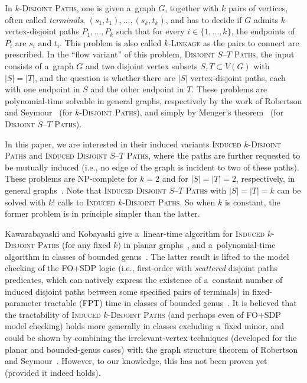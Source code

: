 \documentclass[a4paper,UKenglish,cleveref,autoref]{lipics-v2021}
\begin{document}
In \textsc{$k$-Disjoint Paths}, one is given a~graph $G$, together with $k$ pairs of vertices, often called \emph{terminals}, $(s_1,t_1), \ldots, (s_k,t_k)$, and has to decide if $G$ admits $k$ vertex-disjoint paths $P_1, \ldots, P_k$ such that for every $i \in \{1, \ldots, k\}$, the endpoints of $P_i$ are $s_i$ and $t_i$.
This problem is also called \textsc{$k$-Linkage} as the pairs to connect are prescribed.
In the ``flow variant'' of this problem, \textsc{Disjoint $S$--$T$ Paths}, the input consists of a~graph $G$ and two disjoint vertex subsets $S, T \subset V(G)$ with $|S|=|T|$, and the question is whether there are $|S|$ vertex-disjoint paths, each with one endpoint in $S$ and the other endpoint in $T$.
These problems are polynomial-time solvable in general graphs, respectively by the work of Robertson and Seymour~\cite{Robertson95} (for \textsc{$k$-Disjoint Paths}), and simply by Menger's theorem~\cite{Menger27} (for \textsc{Disjoint $S$--$T$ Paths}).

In this paper, we are interested in their induced variants \textsc{Induced $k$-Disjoint Paths} and \textsc{Induced Disjoint $S$--$T$ Paths}, where the paths are further requested to be mutually induced (i.e., no edge of the graph is incident to two of these paths).
These problems are NP-complete for $k=2$ and for $|S|=|T|=2$, respectively, in general graphs~\cite{Fellows89,bienstock:evenpair}.
Note that \textsc{Induced Disjoint $S$--$T$ Paths} with $|S|=|T|=k$ can be solved with $k!$ calls to \textsc{Induced $k$-Disjoint Paths}.
So when $k$ is constant, the former problem is in principle simpler than the latter.

Kawarabayashi and Kobayashi give a~linear-time algorithm for \textsc{Induced $k$-Disjoint Paths} (for any fixed $k$) in planar graphs~\cite{KawarabayashiK12}, and a~polynomial-time algorithm in classes of bounded genus~\cite{KobayashiK09}.
The latter result is lifted to the model checking of the FO+SDP logic (i.e., first-order with \emph{scattered} disjoint paths predicates, which can natively express the existence of a~constant number of induced disjoint paths between some specified pairs of terminals) in fixed-parameter tractable (FPT) time in classes of bounded genus~\cite{GolovachST23}.
It is believed that the tractability of \textsc{Induced $k$-Disjoint Paths} (and perhaps even of FO+SDP model checking) holds more generally in classes excluding a~fixed minor, and could be shown by combining the irrelevant-vertex techniques (developed for the planar and bounded-genus cases) with the graph structure theorem of Robertson and Seymour~\cite{Robertson03}. 
However, to our knowledge, this has not been proven yet (provided it indeed holds).
\end{document}
